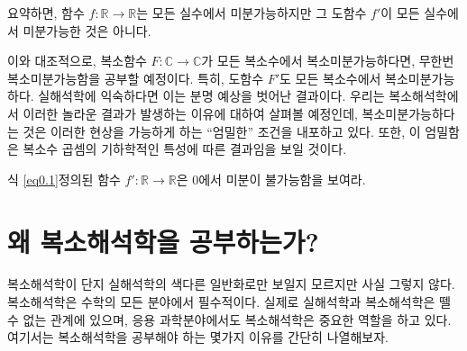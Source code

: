 \begin{saltexample}[label=example-0-1]{}{}
\saltvskipex
요약하면, 함수 $f:\mathbb R \to \mathbb R$는 모든 실수에서 미분가능하지만 
그 도함수 $f'$이 모든 실수에서 미분가능한 것은 아니다.

\saltvskipex
이와 대조적으로, 복소함수 $F:\mathbb C \to \mathbb C$가
모든 복소수에서 복소미분가능하다면, 무한번 복소미분가능함을 공부할 예정이다.
특히, 도함수 $F'$도 모든 복소수에서 복소미분가능하다.
실해석학에 익숙하다면 이는 분명 예상을 벗어난 결과이다.
우리는 복소해석학에서 이러한 놀라운 결과가 발생하는 이유에 대하여 살펴볼 예정인데,
복소미분가능하다는 것은 이러한 현상을 가능하게 하는 ``엄밀한'' 조건을 내포하고 있다.
또한, 이 엄밀함은 복소수 곱셈의 기하학적인 특성에 따른 결과임을 보일 것이다.
\end{saltexample}


\begin{salt_exercise} \label{ex-0-1}
식 \eqref{eq0.1} 정의된 함수 $f':\mathbb R \to \mathbb R$은
$0$에서 미분이 불가능함을 보여라.
\end{salt_exercise}

\section*{왜 복소해석학을 공부하는가?}

복소해석학이 단지 실해석학의 색다른 일반화로만 보일지 모르지만 사실 그렇지 않다. 
복소해석학은 수학의 모든 분야에서 필수적이다.
실제로 실해석학과 복소해석학은 뗄 수 없는 관계에 있으며,
응용 과학분야에서도 복소해석학은 중요한 역할을 하고 있다.
여기서는 복소해석학을 공부해야 하는 몇가지 이유를 간단히 나열해보자.

